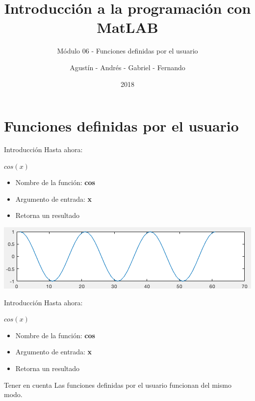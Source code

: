 \documentclass{bredelebeamer}
\title[Programación en MatLAB]{Introducción a la programación con MatLAB}
\subtitle{Módulo 06 - Funciones definidas por el usuario}
\author{Agustín - Andrés - Gabriel - Fernando\inst{1}}
\institute[UTN.BA]
{
  \inst{1}%
  Universidad Tecnológica Nacional\\
  Facultad Regional Buenos Aires
  }
\date{2018}
\begin{document}
\begin{frame}
  \titlepage 
\end{frame}




\section{Funciones definidas por el usuario}

\begin{frame}{Introducción}
Hasta ahora:
\begin{center}
$cos(x)$
\end{center}
\begin{itemize}
\item Nombre de la función: \textbf{cos}
\item Argumento de entrada: \textbf{x}
\item Retorna un resultado\\
\end{itemize}
\begin{center}
\includegraphics[scale=0.5]{images/img43.png}
\end{center}
\end{frame}

\begin{frame}{Introducción}
Hasta ahora:
\begin{center}
$cos(x)$
\end{center}
\begin{itemize}
\item Nombre de la función: \textbf{cos}
\item Argumento de entrada: \textbf{x}
\item Retorna un resultado\\
\end{itemize}
\begin{block}{Tener en cuenta}
Las funciones definidas por el usuario funcionan del mismo modo.
\end{block}
\end{frame}
\end{document}
